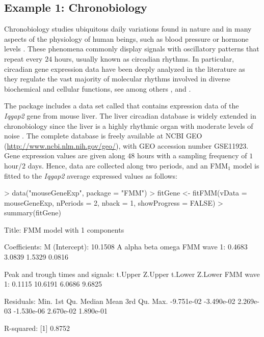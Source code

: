 \subsection{Example 1: Chronobiology}\label{subsec:exCrono}
Chronobiology studies ubiquitous daily variations found in nature and in many aspects of the physiology of human beings, such as blood pressure or hormone levels \citep{Mermet+Yeung+Naef:2017}. These phenomena commonly display signals with oscillatory patterns that repeat every $24$ hours, usually known as circadian rhythms. In particular, circadian gene expression data have been deeply analyzed in the literature as they regulate the vast majority of molecular rhythms involved in diverse biochemical and cellular functions, see among others \cite{Zhang+Lahens+Ballance+Hughes+Hogenesch:2014}, \cite{Cornelissen:2014} and \cite{Larriba+Rueda+Fernandez+Peddada:2020}.

The  package includes a data set called  that contains expression data of the \textit{Iqgap2} gene from mouse liver. The liver circadian database is widely extended in chronobiology since the liver is a highly rhythmic organ with moderate levels of noise \citep{Anafi+Francey+Hogenesch+Kim:2017,Larriba+Rueda+Fernandez+Peddada:2018,Larriba+Rueda+Fernandez+Peddada:2020}. The complete database is freely available at NCBI GEO (\url{http://www.ncbi.nlm.nih.gov/geo/}), with GEO accession number GSE11923. Gene expression values are given along $48$ hours with a sampling frequency of $1$ hour/$2$ days. Hence, data are collected along two periods, and an FMM$_1$ model is fitted to the \textit{Iqgap2} average expressed values as follows: 
%
\begin{example}
> data("mouseGeneExp", package = "FMM")
> fitGene <- fitFMM(vData = mouseGeneExp, nPeriods = 2, nback = 1, showProgress = FALSE)
> summary(fitGene)

Title:
FMM model with 1 components

Coefficients:
M (Intercept): 10.1508
                  A  alpha   beta  omega
FMM wave 1:  0.4683 3.0839 1.5329 0.0816

Peak and trough times and signals:
             t.Upper Z.Upper t.Lower Z.Lower
FMM wave 1:   0.1115 10.6191  6.0686  9.6825

Residuals:
      Min.    1st Qu.     Median       Mean    3rd Qu.       Max. 
-9.751e-02 -3.490e-02  2.269e-03 -1.530e-06  2.670e-02  1.890e-01 

R-squared:
[1] 0.8752
\end{example}
%

